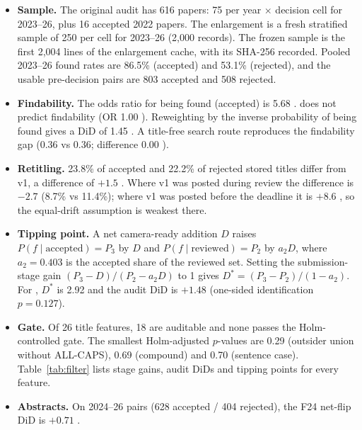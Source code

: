 \begin{itemize}
\item \textbf{Sample.} The original audit has 616 papers: 75 per year $\times$ decision cell for 2023--26, plus 16 accepted 2022 papers. The enlargement is a fresh stratified sample of 250 per cell for 2023--26 (2,000 records). The frozen sample is the first 2,004 lines of the enlargement cache, with its SHA-256 recorded. Pooled 2023--26 found rates are 86.5\% (accepted) and 53.1\% (rejected), and the usable pre-decision pairs are 803 accepted and 508 rejected.
\item \textbf{Findability.} The odds ratio for being found (accepted) is 5.68 . \NAME{} does not predict findability (OR 1.00 ). Reweighting by the inverse probability of being found gives a \NAME{} DiD of 1.45\pp{} . A title-free search route reproduces the findability gap (0.36 vs 0.36; difference 0.00 ).
\item \textbf{Retitling.} 23.8\% of accepted and 22.2\% of rejected stored titles differ from v1, a difference of $+1.5$\pp{} . Where v1 was posted during review the difference is $-2.7$\pp{}  (8.7\% vs 11.4\%); where v1 was posted before the deadline it is $+8.6$\pp{} , so the equal-drift assumption is weakest there.
\item \textbf{Tipping point.} A net camera-ready addition $D$ raises $P(f\mid\text{accepted})=P_3$ by $D$ and $P(f\mid\text{reviewed})=P_2$ by $a_2 D$, where $a_2=0.403$ is the accepted share of the reviewed set. Setting the submission-stage gain $(P_3-D)/(P_2-a_2D)$ to 1 gives $D^*=(P_3-P_2)/(1-a_2)$. For \NAME, $D^*$ is 2.92\pp{} and the audit DiD is $+1.48$\pp{}  (one-sided identification $p=0.127$).
\item \textbf{Gate.} Of 26 title features, 18 are auditable and none passes the Holm-controlled gate. The smallest Holm-adjusted $p$-values are 0.29 (outsider union without ALL-CAPS), 0.69 (compound) and 0.70 (sentence case). Table~\ref{tab:filter} lists stage gains, audit DiDs and tipping points for every feature.
\item \textbf{Abstracts.} On 2024--26 pairs (628 accepted / 404 rejected), the F24 net-flip DiD is $+0.71$\pp{} .
\end{itemize}



